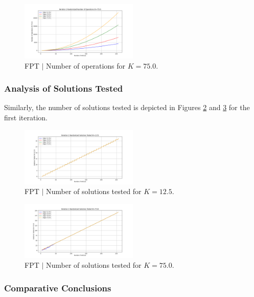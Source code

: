 \begin{figure}[h]
\centering
\includegraphics[width=0.5\textwidth]{FPT/Number of Operations (K=75.0).png}
\caption{FPT \(|\) Number of operations for \( K=75.0 \).}
\label{fig:ops_75_first}
\end{figure}

\subsubsection{Analysis of Solutions Tested}

Similarly, the number of solutions tested is depicted in Figures \ref{fig:sol_12_5_first} and \ref{fig:sol_75_first} for the first iteration.

\begin{figure}[h]
\centering
\includegraphics[width=0.5\textwidth]{FPT/Solutions Tested (K=12.5).png}
\caption{FPT \(|\) Number of solutions tested for \( K=12.5 \).}
\label{fig:sol_12_5_first}
\end{figure}

\begin{figure}[h]
\centering
\includegraphics[width=0.5\textwidth]{FPT/Solutions Tested (K=75.0).png}
\caption{FPT \(|\) Number of solutions tested for \( K=75.0 \).}
\label{fig:sol_75_first}
\end{figure}

\subsubsection{Comparative Conclusions}

